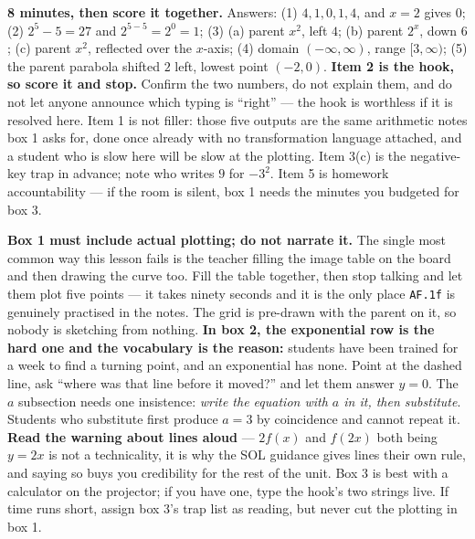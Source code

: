 \documentclass[10pt]{article}
\begin{document}
\boxguard[18]
\begin{teachernote}[Warm-Up]
    \textbf{8 minutes, then score it together.} Answers: (1) $4,1,0,1,4$, and $x=2$ gives $0$;
    (2) $2^5-5=27$ and $2^{5-5}=2^0=1$; (3) (a) parent $x^2$, left $4$; (b) parent $2^x$, down $6$;
    (c) parent $x^2$, reflected over the $x$-axis; (4) domain $(-\infty,\infty)$, range
    $[3,\infty)$; (5) the parent parabola shifted $2$ left, lowest point $(-2,0)$. \textbf{Item 2 is
    the hook, so score it and stop.} Confirm the two numbers, do not explain them, and do not let
    anyone announce which typing is ``right'' --- the hook is worthless if it is resolved here. Item
    1 is not filler: those five outputs are the same arithmetic notes box 1 asks for, done once
    already with no transformation language attached, and a student who is slow here will be slow at
    the plotting. Item 3(c) is the negative-key trap in advance; note who writes $9$ for $-3^2$.
    Item 5 is homework accountability --- if the room is silent, box 1 needs the minutes you
    budgeted for box 3.
\end{teachernote}

\boxguard[18]
\begin{teachernote}
    \textbf{Box 1 must include actual plotting; do not narrate it.} The single most common way this
    lesson fails is the teacher filling the image table on the board and then drawing the curve too.
    Fill the table together, then stop talking and let them plot five points --- it takes ninety
    seconds and it is the only place \texttt{AF.1f} is genuinely practised in the notes. The grid is
    pre-drawn with the parent on it, so nobody is sketching from nothing. \textbf{In box 2, the
    exponential row is the hard one and the vocabulary is the reason:} students have been trained for
    a week to find a turning point, and an exponential has none. Point at the dashed line, ask ``where
    was that line before it moved?'' and let them answer $y=0$. The $a$ subsection needs one
    insistence: \emph{write the equation with $a$ in it, then substitute}. Students who substitute
    first produce $a=3$ by coincidence and cannot repeat it. \textbf{Read the warning about lines
    aloud} --- $2f(x)$ and $f(2x)$ both being $y=2x$ is not a technicality, it is why the SOL guidance
    gives lines their own rule, and saying so buys you credibility for the rest of the unit. Box 3 is
    best with a calculator on the projector; if you have one, type the hook's two strings live. If
    time runs short, assign box 3's trap list as reading, but never cut the plotting in box 1.
\end{teachernote}
\end{document}
